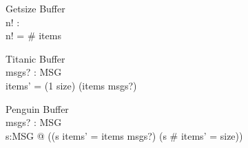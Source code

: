 \begin{schema}{Getsize}
\Xi Buffer\\
n! : \nat \\
\where
n! = \# items \\
\end{schema}

\begin{schema}{Titanic}
\Delta Buffer \\
 msgs? : \seq MSG\\
\where
 items' = (1 \upto size) \dres (items \cat msgs?)
\end{schema}

\begin{schema}{Penguin}
\Delta Buffer\\
msgs? : \seq MSG \\
\where
\exists s:\seq MSG @  ((s \cat items' = items \cat msgs?) \land (s \neq \emptyset \implies \# items' = size)) \\
\end{schema}


